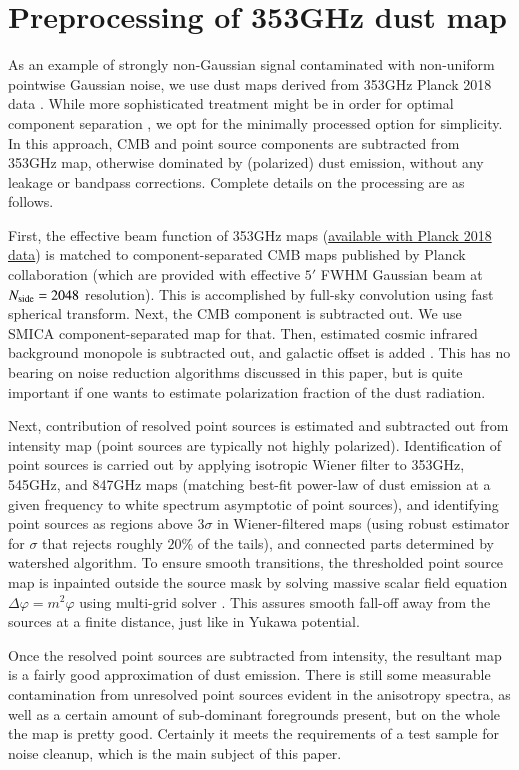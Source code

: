 \documentclass{aa}
\newcommand{\nside}{\ensuremath N_{\text{side}}}
\begin{document}
\section{Preprocessing of 353GHz dust map}
\label{sec:app:dust}

As an example of strongly non-Gaussian signal contaminated with non-uniform pointwise Gaussian noise, we use dust maps derived from 353GHz Planck 2018 data \citep{2020A&A...641A...3P}. While more sophisticated treatment might be in order for optimal component separation \citep{2008A&A...491..597L, 2014A&A...571A..11P, 2020A&A...641A...4P}, we opt for the minimally processed option for simplicity. In this approach, CMB and point source components are subtracted from 353GHz map, otherwise dominated by (polarized) dust emission, without any leakage or bandpass corrections. Complete details on the processing are as follows.

First, the effective beam function of 353GHz maps (\href{https://wiki.cosmos.esa.int/planck-legacy-archive/index.php/Effective_Beams}{available with Planck 2018 data}) is matched to component-separated CMB maps published by Planck collaboration (which are provided with effective $5'$ FWHM Gaussian beam at $\nside = 2048$ resolution). This is accomplished by full-sky convolution using fast spherical transform. Next, the CMB component is subtracted out. We use SMICA component-separated map for that. Then, estimated cosmic infrared background monopole
is subtracted out, and galactic offset
is added \citep{2014A&A...571A..11P}. This has no bearing on noise reduction algorithms discussed in this paper, but is quite important if one wants to estimate polarization fraction of the dust radiation.

Next, contribution of resolved point sources is estimated and subtracted out from intensity map (point sources are typically not highly polarized). Identification of point sources is carried out by applying isotropic Wiener filter to 353GHz, 545GHz, and 847GHz maps (matching best-fit power-law of dust emission at a given frequency to white spectrum asymptotic of point sources), and identifying point sources as regions above $3\sigma$ in Wiener-filtered maps (using robust estimator for $\sigma$ that rejects roughly $20$\% of the tails), and connected parts determined by watershed algorithm. To ensure smooth transitions, the thresholded point source map is inpainted outside the source mask by solving massive scalar field equation $\Delta\varphi = m^2\varphi$ using multi-grid solver \citep{Brandt:1977, 2020A&A...641A...7P}. This assures smooth fall-off away from the sources at a finite distance, just like in Yukawa potential. 

Once the resolved point sources are subtracted from intensity, the resultant map is a fairly good approximation of dust emission. There is still some measurable contamination from unresolved point sources evident in the anisotropy spectra, as well as a certain amount of sub-dominant foregrounds present, but on the whole the map is pretty good. Certainly it meets the requirements of a test sample for noise cleanup, which is the main subject of this paper.
\end{document}
